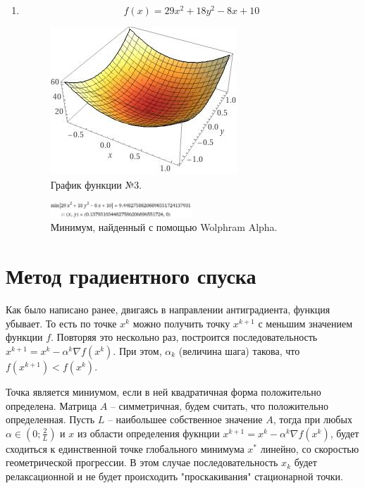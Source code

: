 \documentclass[12pt]{article}
\begin{document}
\begin{enumerate}
\newpage
\item \[ f(x) = 29x^2+18y^2-8x+10 \]
\begin{figure}[H]
	\centering
	\includegraphics[scale=0.5]{img/func3_plot.jpeg}
	\caption{График функции №3.}
\end{figure}

\begin{figure}[H]
	\centering
	\includegraphics[width=0.5\textwidth]{img/func3_min.jpeg}
	\caption{Минимум, найденный с помощью Wolphram Alpha.}
\end{figure}

\end{enumerate}

\newpage
\section{Метод градиентного спуска}

Как было написано ранее, двигаясь в направлении антиградиента, функция убывает. То есть по точке $x^k$ можно получить точку $x^{k+1}$ с меньшим значением функции $f$. Повторяя это нескольно раз, построится последовательность $x^{k+1} = x^{k} - \alpha^{k} \nabla f(x^k)$. При этом, $\alpha_k$ (величина шага) такова, что $f(x^{k+1}) < f(x^k)$.  

Точка является миниумом, если в ней квадратичная форма положительно определена. Матрица $A$ -- симметричная, будем считать, что положительно определенная. Пусть $L$ -- наибольшее собственное значение $A$, тогда при любых $\alpha \in \left(0; \frac{2}{L} \right)$ и $x$ из области определения фукнции $x^{k+1} = x^{k} - \alpha^{k} \nabla f(x^k)$, будет сходиться к единственной точке глобального минимума $x^*$ линейно, со скоростью геометрической прогрессии. В этом случае последовательность $x_k$ будет релаксационной и не будет происходить "проскакивания" стационарной точки.
\end{document}
